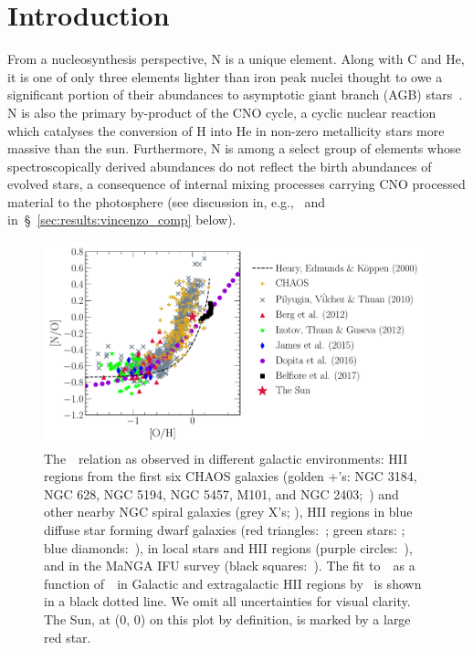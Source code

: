 \documentclass[ms.tex]{subfiles}
\begin{document}
\section{Introduction}
\label{sec:intro}

From a nucleosynthesis perspective, N is a unique element.
Along with C and He, it is one of only three elements lighter
than iron peak nuclei thought to owe a significant portion of their abundances
to asymptotic giant branch (AGB) stars~\citep{Johnson2019}.
N is also the primary by-product of the CNO cycle, a cyclic nuclear reaction
which catalyses the conversion of H into He in non-zero metallicity
stars more massive than the sun.
Furthermore, N is among a select group of elements whose spectroscopically
derived abundances do not reflect the birth abundances of evolved stars, a
consequence of internal mixing processes carrying CNO processed material
to the photosphere (see discussion in, e.g.,~\citealp{Vincenzo2021} and
in~\S~\ref{sec:results:vincenzo_comp} below).

\begin{figure}
\centering
\includegraphics[scale = 0.63]{no_oh_observed.pdf}
\caption{
	The~\ohno~relation as observed in different galactic environments:
	HII regions from the first six CHAOS galaxies (golden +'s: NGC 3184, NGC
	628, NGC 5194, NGC 5457, M101, and NGC 2403;~\citealp{Berg2020,
	Skillman2020, Rogers2021}) and other nearby NGC spiral galaxies (grey X's;
	\citealp{Pilyugin2010}), HII regions in blue diffuse star forming dwarf
	galaxies (red triangles:~\citealp{Berg2012}; green stars:
	\citealp{Izotov2012}; blue diamonds:~\citealp{James2015}), in local stars
	and HII regions (purple circles:~\citealp{Dopita2016}), and in the MaNGA
	IFU survey (black squares:~\citealp{Belfiore2017}).
	The fit to~\no~as a function of~\oh~in Galactic and extragalactic HII
	regions by~\citet{Henry2000} is shown in a black dotted line.
	We omit all uncertainties for visual clarity.
	The Sun, at (0, 0) on this plot by definition, is marked by a large red
	star. 
}
\label{fig:no_oh_observed}
\end{figure}
\end{document}
